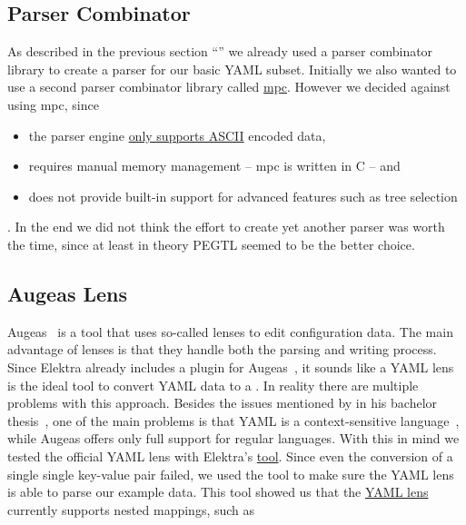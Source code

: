 \subsection{Parser Combinator}

As described in the previous section “” we already used a parser combinator library to create a parser for our basic YAML subset. Initially we also wanted to use a second parser combinator library called \href{https://github.com/orangeduck/mpc}{mpc}. However we decided against using mpc, since

\begin{itemize}
  \item the parser engine \href{https://github.com/orangeduck/mpc#does-mpc-support-unicode}{only supports ASCII} encoded data,
  \item requires manual memory management – mpc is written in C – and
  \item does not provide built-in support for advanced features such as tree selection
\end{itemize}

. In the end we did not think the effort to create yet another parser was worth the time, since at least in theory PEGTL seemed to be the better choice.

\subsection{Augeas Lens}

Augeas~\cite{lutterkort2008augeas} is a tool that uses so-called
lenses to edit configuration data. The main advantage of lenses is that they
handle both the parsing and writing process. Since Elektra already includes a
plugin for Augeas~\cite{berlakovich2016universal}, it sounds like a YAML
lens is the ideal tool to convert YAML data to a . In reality there
are multiple problems with this approach. Besides the issues mentioned by
\citeauthor{berlakovich2016universal} in his bachelor thesis~\cite{berlakovich2016universal}, one of
the main problems is that YAML is a context-sensitive
language~\cite{lutterkort2017augeas}, while Augeas offers only full support for
regular languages. With this in mind we tested the official YAML lens with Elektra’s \href{https://www.libelektra.org/manpages/kdb}{ tool}. Since even the conversion of a single single key-value pair failed, we used the tool \href{https://github.com/raphink/augeas-sandbox/blob/master/augcheck}{} to make sure the YAML lens is able to parse our example data. This tool showed us that the \href{https://github.com/hercules-team/augeas/blob/d555a995a06ac81cab62d016d6eaff8a7ba64a2e/lenses/tests/test_yaml.aug}{YAML lens} currently supports nested mappings, such as

